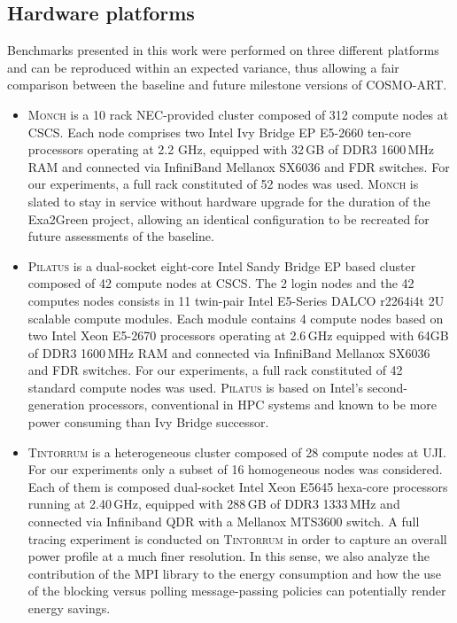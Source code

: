 \subsection{Hardware platforms}
\label{subsec:3.1}

Benchmarks presented  in this work  were performed on  three different
platforms  and can  be reproduced  within an  expected  variance, thus
allowing a  fair comparison between the baseline  and future milestone
versions of \textsc{COSMO-ART}.

\begin{itemize}
\item \textsc{Monch} is a 10 rack NEC-provided cluster composed
  of 312 compute  nodes %
   at CSCS. Each
  node comprises two Intel Ivy Bridge EP  E5-2660 ten-core processors
  operating at  2.2 GHz, equipped with 32\,GB of DDR3 1600\,MHz  RAM and connected  via InfiniBand Mellanox  SX6036 and FDR switches. For our  experiments, 
  a full rack constituted of 52 nodes was used. \textsc{Monch} is  slated to stay
  in  service  without  hardware  upgrade  for  the  duration  of  the
  Exa2Green  project,  allowing   an  identical  configuration  to  be
  recreated for future assessments of the baseline.\\

\item \textsc{Pilatus} is a dual-socket eight-core Intel Sandy
  Bridge EP based cluster composed of 42 compute nodes %
  at  CSCS.  The 2 login  nodes and
  the 42 computes nodes consists in 11 twin-pair Intel E5-Series DALCO
  r2264i4t 2U scalable compute modules. Each module contains 4 compute
  nodes based  on two Intel Xeon E5-2670 processors operating  at 2.6\,GHz equipped with 64GB of DDR3 1600\,MHz RAM and connected  via InfiniBand Mellanox SX6036 and FDR switches. 
  For our  experiments, a  full rack constituted  of 42 standard  compute nodes
  was used. \textsc{Pilatus}  is based  on  Intel's second-generation
  processors, conventional in  HPC systems and known to  be more power
  consuming than Ivy Bridge successor.\\

\item \textsc{Tintorrum} is  a heterogeneous cluster composed of
  28 compute nodes at UJI. For our  experiments only a subset of 16 homogeneous nodes was considered. Each of them is composed dual-socket Intel Xeon E5645 hexa-core processors 
  running at 2.40\,GHz, equipped with 288\,GB  of DDR3 1333\,MHz and connected via Infiniband QDR with a Mellanox MTS3600 switch. A  full tracing  experiment is  conducted on
  \textsc{Tintorrum} in order to  capture an overall  power profile at a much
  finer resolution. In this sense, we also analyze the contribution of the MPI library
  to the energy consumption and how the use of the blocking versus polling
  message-passing policies can potentially render energy savings.
\end{itemize}

